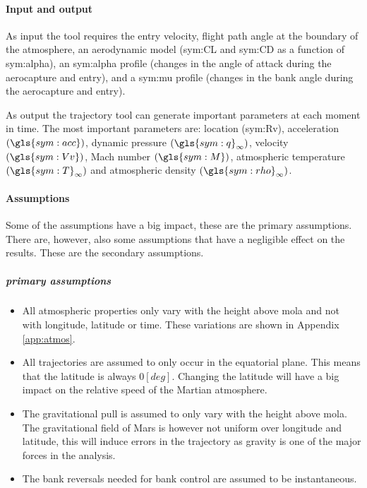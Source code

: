 \paragraph{Input and output}
As input the tool requires the entry velocity, flight path angle at the boundary of the atmosphere, an aerodynamic model (\gls{sym:CL} and \gls{sym:CD} as a function of \gls{sym:alpha}), an \gls{sym:alpha} profile (changes in the angle of attack during the aerocapture and entry), and a \gls{sym:mu} profile (changes in the bank angle during the aerocapture and entry).

As output the trajectory tool can generate important parameters at each moment in time. The most important parameters are: location (\gls{sym:Rv}), acceleration $\left(\gls{sym:acc}\right)$, dynamic pressure $\left(\gls{sym:q}_{\infty}\right)$, velocity $\left(\gls{sym:Vv}\right)$, Mach number $\left(\gls{sym:M}\right)$, atmospheric temperature $\left(\gls{sym:T}_{\infty}\right)$ and atmospheric density $\left(\gls{sym:rho}_{\infty}\right)$.

\paragraph{Assumptions}
 \label{sec:astroassumption}
 Some of the assumptions have a big impact, these are the primary assumptions. There are, however, also some assumptions that have a negligible effect on the results. These are the secondary assumptions.
 
 \subparagraph{primary assumptions}
 \begin{itemize}
 \item All atmospheric properties only vary with the height above \gls{mola} and not with longitude, latitude or time. These variations are shown in Appendix \ref{app:atmos}. 
 \item All trajectories are assumed to only occur in the equatorial plane. This means that the latitude is always $0 \left[deg\right]$. Changing the latitude will have a big impact on the relative speed of the Martian atmosphere.
 \item The gravitational pull is assumed to only vary with the height above \gls{mola}. The gravitational field of Mars is however not uniform over longitude and latitude, this will induce errors in the trajectory as gravity is one of the major forces in the analysis.
 \item The bank reversals needed for bank control are assumed to be instantaneous.
 \end{itemize}


